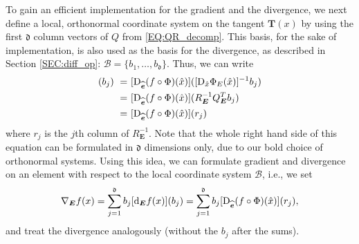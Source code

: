 \documentclass[a4paper, english, 12pt, reqno, draft]{amsart}
\theoremstyle{definition}
\theoremstyle{remark}
\numberwithin{equation}{section}
\newcommand{\edge}{\ensuremath{E}}
\newcommand{\Edge}{{\ensuremath{\boldsymbol E}}}
\newcommand{\RefEdge}{{\ensuremath{\widehat{\boldsymbol e}}}}
\newcommand{\locDim}{\ensuremath{\mathfrak d}}
\newcommand{\Der}{\ensuremath{\textup d_\Edge}}
\newcommand{\Nabla}{\ensuremath{\nabla_\Edge}}
\newcommand{\tangent}{\ensuremath{{\boldsymbol T}}}
\newcommand{\diffeo}{\ensuremath{\Phi}}
\newcommand{\der}{\ensuremath{\textup D}}
\newcommand{\matQ}{\ensuremath{Q}}
\newcommand{\matR}{\ensuremath{R}}
\newcommand{\basis}{\ensuremath{\mathcal B}}
\begin{document}
To gain an efficient implementation for the gradient and the divergence, we next define a local, orthonormal coordinate system on the tangent $\tangent(x)$ by using the first $\locDim$ column vectors of $\matQ$ from \eqref{EQ:QR_decomp}. This basis, for the sake of implementation, is also used as the basis for the divergence, as described in Section \ref{SEC:diff_op}: $\basis = \{b_1, \ldots, b_\locDim\}$. Thus, we can write
% 
\begin{align*}
 [\Der f (x)] (b_j) ~=~ & [\der_\RefEdge (f \circ \diffeo) (\hat x)]([\der_{\hat x} \diffeo_\edge(\hat x)]^{-1} b_j)\\
 ~=~ & [\der_\RefEdge (f \circ \diffeo) (\hat x)] (\matR^{-1}_\Edge \matQ^T_\Edge b_j)\\
 ~=~ & [\der_\RefEdge (f \circ \diffeo) (\hat x)] (r_j)
\end{align*}
% 
where $r_j$ is the $j$th column of $\matR_\Edge^{-1}$. Note that the whole right hand side of this equation can be formulated in $\locDim$ dimensions only, due to our bold choice of orthonormal systems. Using this idea, we can formulate gradient and divergence on an element with respect to the local coordinate system $\basis$, i.e., we set
% 
\begin{equation}
 \Nabla f(x) = \sum_{j=1}^\locDim b_j [\Der f (x)] (b_j) = \sum_{j=1}^\locDim b_j [\der_\RefEdge (f \circ \diffeo) (\hat x)] (r_j),
\end{equation}
% 
and treat the divergence analogously (without the $b_j$ after the sums).
% 
\end{document}
